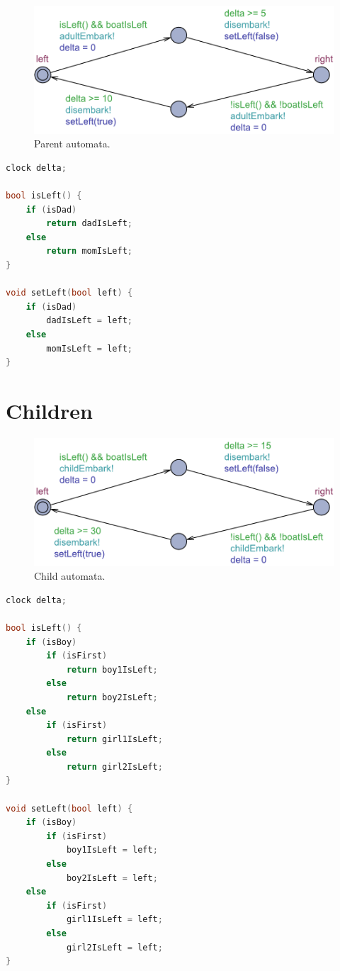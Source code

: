 \documentclass[a4paper,12pt]{scrartcl}
\begin{document}
\begin{figure}[h!]
\centering
\includegraphics[width=0.7\linewidth]{Parent.pdf}
\caption{Parent automata.}
\label{fig:parent}
\end{figure}



\begin{lstlisting}[language=CPP, label = lst:plugin_example, caption = Parent declaration.]
clock delta;

bool isLeft() {
    if (isDad)
        return dadIsLeft;
    else
        return momIsLeft;
}

void setLeft(bool left) {
    if (isDad)
        dadIsLeft = left;
    else
        momIsLeft = left;
}
\end{lstlisting}



\section*{Children}

\begin{figure}[h!]
\centering
\includegraphics[width=0.7\linewidth]{Child.pdf}
\caption{Child automata.}
\label{fig:child}
\end{figure}

\begin{lstlisting}[language=CPP, label = lst:plugin_example, caption = Child declaration.]
clock delta;

bool isLeft() {
    if (isBoy)
        if (isFirst)
            return boy1IsLeft;
        else
            return boy2IsLeft;
    else
        if (isFirst)
            return girl1IsLeft;
        else
            return girl2IsLeft;
}

void setLeft(bool left) {
    if (isBoy)
        if (isFirst)
            boy1IsLeft = left;
        else
            boy2IsLeft = left;
    else
        if (isFirst)
            girl1IsLeft = left;
        else
            girl2IsLeft = left;
}
\end{lstlisting}
\end{document}
